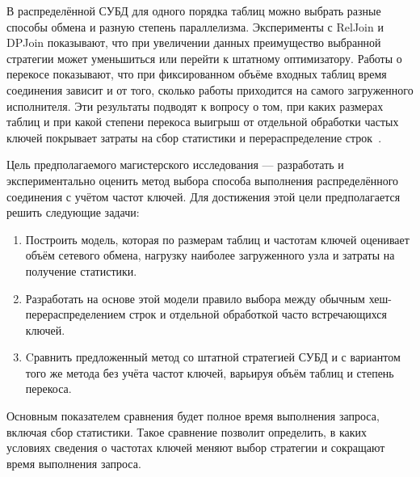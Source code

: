 \documentclass[a4paper, final]{article}
\begin{document}
	В распределённой СУБД для одного порядка таблиц можно выбрать разные способы обмена и разную степень параллелизма. Эксперименты с RelJoin и DPJoin показывают, что при увеличении данных преимущество выбранной стратегии может уменьшиться или перейти к штатному оптимизатору. Работы о перекосе показывают, что при фиксированном объёме входных таблиц время соединения зависит и от того, сколько работы приходится на самого загруженного исполнителя. Эти результаты подводят к вопросу о том, при каких размерах таблиц и при какой степени перекоса выигрыш от отдельной обработки частых ключей покрывает затраты на сбор статистики и перераспределение строк~\cite{liang2024,turkmen2026,prpq2017,kassela2025,flowjoin2026}.
	
	Цель предполагаемого магистерского исследования --- разработать и экспериментально оценить метод выбора способа выполнения распределённого соединения с учётом частот ключей. Для достижения этой цели предполагается решить следующие задачи:
	\begin{enumerate} 
		\item Построить модель, которая по размерам таблиц и частотам ключей оценивает объём сетевого обмена, нагрузку наиболее загруженного узла и затраты на получение статистики. 
		\item Разработать на основе этой модели правило выбора между обычным хеш-перераспределением строк и отдельной обработкой часто встречающихся ключей. 
		\item Cравнить предложенный метод со штатной стратегией СУБД и с вариантом того же метода без учёта частот ключей, варьируя объём таблиц и степень перекоса.
\end{enumerate}
		 Основным показателем сравнения будет полное время выполнения запроса, включая сбор статистики. Такое сравнение позволит определить, в каких условиях сведения о частотах ключей меняют выбор стратегии и сокращают время выполнения запроса.
	
	
\end{document}
